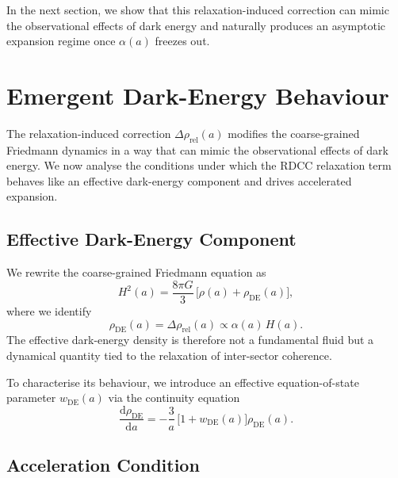 \documentclass[11pt,a4paper]{article}
\newcommand{\Ha}{H(a)}
\newcommand{\alphaR}{\alpha}
\newcommand{\dd}{\mathrm{d}}
\begin{document}
In the next section, we show that this relaxation-induced correction can mimic
the observational effects of dark energy and naturally produces an asymptotic
expansion regime once $\alphaR(a)$ freezes out.




\section{Emergent Dark-Energy Behaviour}

The relaxation-induced correction $\Delta\rho_{\mathrm{rel}}(a)$ modifies the
coarse-grained Friedmann dynamics in a way that can mimic the observational
effects of dark energy. We now analyse the conditions under which the RDCC
relaxation term behaves like an effective dark-energy component and drives
accelerated expansion.

\subsection{Effective Dark-Energy Component}

We rewrite the coarse-grained Friedmann equation as
\begin{equation}
H^{2}(a)
    = \frac{8\pi G}{3}\,\big[\rho(a) + \rho_{\mathrm{DE}}(a)\big],
\end{equation}
where we identify
\begin{equation}
\rho_{\mathrm{DE}}(a)
    = \Delta\rho_{\mathrm{rel}}(a)
    \propto \alphaR(a)\,\Ha.
\end{equation}
The effective dark-energy density is therefore not a fundamental fluid but a
dynamical quantity tied to the relaxation of inter-sector coherence.

To characterise its behaviour, we introduce an effective equation-of-state
parameter $w_{\mathrm{DE}}(a)$ via the continuity equation
\begin{equation}
\frac{\dd\rho_{\mathrm{DE}}}{\dd a}
    = -\frac{3}{a}\,\big[1 + w_{\mathrm{DE}}(a)\big]\rho_{\mathrm{DE}}(a).
\end{equation}

\subsection{Acceleration Condition}
\end{document}

